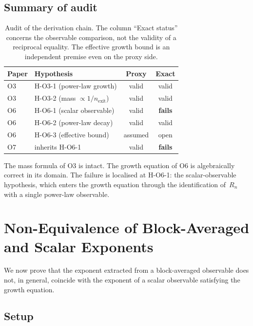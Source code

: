 \documentclass[11pt,a4paper]{article}
\newcommand{\Rn}{R_n}
\begin{document}
\subsection{Summary of audit}
\label{sec:auditsummary}

\begin{table}[ht]
\centering
\caption{Audit of the derivation chain.
The column ``Exact status'' concerns the observable comparison, not the validity of a reciprocal equality.
The effective growth bound is an independent premise even on the proxy side.}
\label{tab:audit}
\begin{tabular}{llcc}
\toprule
Paper & Hypothesis & Proxy & Exact \\
\midrule
O3 & H-O3-1 (power-law growth) & valid & valid \\
O3 & H-O3-2 (mass $\propto 1/n_{\mathrm{exit}}$) & valid & valid \\
O6 & H-O6-1 (scalar observable) & valid & \textbf{fails} \\
O6 & H-O6-2 (power-law decay) & valid & valid \\
O6 & H-O6-3 (effective bound) & assumed & open \\
O7 & inherits H-O6-1 & valid & \textbf{fails} \\
\bottomrule
\end{tabular}
\end{table}

The mass formula of O3 is intact.
The growth equation of O6 is algebraically correct in its domain.
The failure is localised at H-O6-1: the scalar-observable hypothesis,
which enters the growth equation through the identification of~$\Rn$
with a single power-law observable.

\section{Non-Equivalence of Block-Averaged and Scalar Exponents}
\label{sec:noneq}

We now prove that the exponent extracted from a block-averaged observable
does not, in general, coincide with the exponent of a scalar observable
satisfying the growth equation.

\subsection{Setup}
\end{document}
